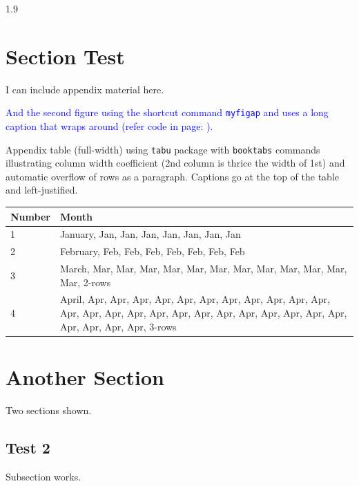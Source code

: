\documentclass[phd]{ndsu-thesis-2022}
\newcommand\myspacing{1.9}      %
\newcommand\italk[1]{\textcolor{blue}{#1}}  %
\begin{document}
\begin{spacing}{\myspacing}
\section{Section Test}

I can include appendix material here. 

\italk{And the second figure using the shortcut command \texttt{myfigap} and uses a long caption that wraps around (refer code in page: \pageref{figv}).}



\kant[1]

\begin{appendixtable}[h]
\centering
\caption{Appendix table (full-width) using \texttt{tabu} package with \texttt{booktabs} commands illustrating column width coefficient (2nd column is thrice the width of 1st) and automatic overflow of rows as a paragraph. Captions go at the top of the table and left-justified.}
\begin{tabu}{X X[3]}
\toprule
Number & Month \\
 & January, Jan,  Jan,  Jan,  Jan,   Jan,  Jan,  Jan \\
2 & February, Feb,  Feb,  Feb,  Feb,  Feb,  Feb,  Feb  \\
\cmidrule(lr){2-2}
3 & March, Mar,  Mar,  Mar,  Mar,  Mar,  Mar,  Mar,  Mar,  Mar,  Mar, Mar, Mar, 2-rows\\
\cmidrule(lr){2-2}
4 & April, Apr, Apr, Apr,  Apr,  Apr,  Apr,  Apr,  Apr,  Apr,  Apr,  Apr,  Apr,  Apr, Apr, Apr,   Apr, Apr, Apr, Apr, Apr, Apr, Apr, Apr, Apr, Apr, Apr, Apr, Apr, 3-rows\\
\bottomrule
\end{tabu}
\end{appendixtable}

\section{Another Section}
Two sections shown. \kant[7]

\subsection{Test 2}
Subsection works.


\end{spacing}
\end{document}
